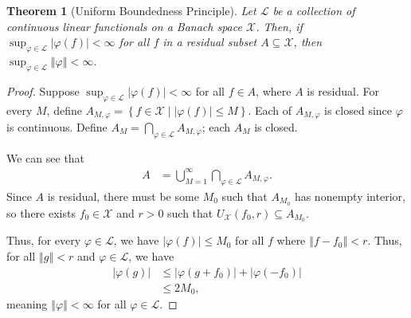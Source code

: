 \documentclass[12pt]{extarticle}
\newcommand{\norm}[1]{\left\Vert #1\right\Vert}
\newcommand{\set}[1]{\left\{#1\right\}}
\theoremstyle{plain}
\newtheorem*{theorem}{Theorem}
\theoremstyle{definition}
\theoremstyle{note}
\renewcommand{\newline}{\hfill\break}
\begin{document}
\begin{theorem}[Uniform Boundedness Principle]
  Let $\mathcal{L}$ be a collection of continuous linear functionals on a Banach space $\mathcal{X}$. Then, if $\sup_{\varphi \in \mathcal{L}}\left\vert \varphi(f) \right\vert < \infty$ for all $f$ in a residual subset $A\subseteq \mathcal{X}$, then $\sup_{\varphi \in \mathcal{L}}\norm{\varphi} < \infty$.
\end{theorem}
\begin{proof}
  Suppose $\sup_{\varphi \in \mathcal{L}}\left\vert \varphi(f) \right\vert < \infty$ for all $f\in A$, where $A$ is residual. For every $M$, define $A_{M,\varphi} = \set{f\in \mathcal{X}\mid \left\vert \varphi(f) \right\vert\leq M}$. Each of $A_{M,\varphi}$ is closed since $\varphi$ is continuous. Define $A_{M} = \bigcap_{\varphi \in \mathcal{L}}A_{M,\varphi}$; each $A_{M}$ is closed.\newline

  We can see that
  \begin{align*}
    A &= \bigcup_{M=1}^{\infty}\bigcap_{\varphi \in \mathcal{L}}A_{M,\varphi}.
  \end{align*}
  Since $A$ is residual, there must be some $M_0$ such that $A_{M_0}$ has nonempty interior, so there exists $f_0\in \mathcal{X}$ and $r > 0$ such that $U_{\mathcal{X}}\left(f_0,r\right)\subseteq A_{M_0}$.\newline

  Thus, for every $\varphi \in \mathcal{L}$, we have $\left\vert \varphi(f) \right\vert \leq M_0$ for all $f$ where $\norm{f-f_0} < r$. Thus, for all $\norm{g} < r$ and $\varphi \in \mathcal{L}$, we have
  \begin{align*}
    \left\vert \varphi(g) \right\vert &\leq \left\vert \varphi(g + f_0) \right\vert + \left\vert \varphi(-f_0) \right\vert\\
                                      &\leq 2M_0,
  \end{align*}
  meaning $\norm{\varphi} < \infty$ for all $\varphi \in \mathcal{L}$.
\end{proof}
\end{document}
